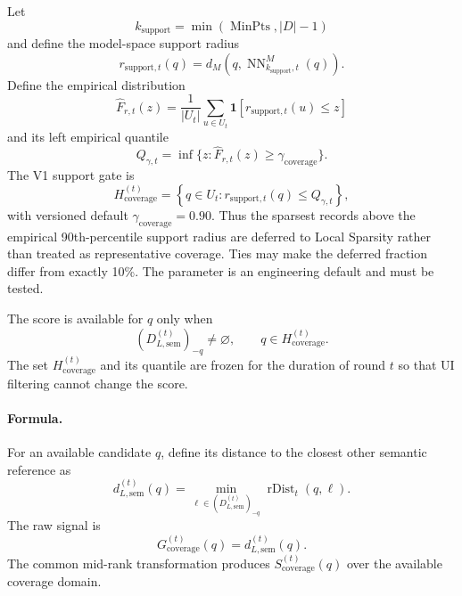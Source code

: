 \documentclass[11pt]{article}
\newcommand{\rDist}{\operatorname{rDist}}
\newcommand{\MinPts}{\operatorname{MinPts}}
\begin{document}
Let
\begin{equation}
    k_{\mathrm{support}}
    =
    \min(\MinPts,|D|-1)
\end{equation}
and define the model-space support radius
\begin{equation}
    r_{\mathrm{support},t}(q)
    =
    d_M\!\left(
        q,
        \operatorname{NN}^{M}_{k_{\mathrm{support}},t}(q)
    \right).
\end{equation}
Define the empirical distribution
\begin{equation}
    \widehat F_{r,t}(z)
    =
    \frac{1}{|U_t|}
    \sum_{u\in U_t}
    \mathbf{1}[r_{\mathrm{support},t}(u)\leq z]
\end{equation}
and its left empirical quantile
\begin{equation}
    Q_{\gamma,t}
    =
    \inf\{z:\widehat F_{r,t}(z)\geq\gamma_{\mathrm{coverage}}\}.
\end{equation}
The V1 support gate is
\begin{equation}
    H_{\mathrm{coverage}}^{(t)}
    =
    \left\{
        q\in U_t:
        r_{\mathrm{support},t}(q)\leq Q_{\gamma,t}
    \right\},
\end{equation}
with versioned default $\gamma_{\mathrm{coverage}}=0.90$. Thus the sparsest
records above the empirical 90th-percentile support radius are deferred to
Local Sparsity rather than treated as representative coverage. Ties may make
the deferred fraction differ from exactly 10\%. The parameter is an engineering
default and must be tested.

The score is available for $q$ only when
\begin{equation}
    (D_{L,\mathrm{sem}}^{(t)})_{-q}\neq\varnothing,
    \qquad
    q\in H_{\mathrm{coverage}}^{(t)}.
\end{equation}
The set $H_{\mathrm{coverage}}^{(t)}$ and its quantile are frozen for the
duration of round $t$ so that UI filtering cannot change the score.

\paragraph{Formula.}
For an available candidate $q$, define its distance to the closest other
semantic reference as
\begin{equation}
    d_{L,\mathrm{sem}}^{(t)}(q)
    =
    \min_{\ell\in(D_{L,\mathrm{sem}}^{(t)})_{-q}}\rDist_t(q,\ell).
\end{equation}
The raw signal is
\begin{equation}
    \boxed{
    G_{\mathrm{coverage}}^{(t)}(q)
    =
    d_{L,\mathrm{sem}}^{(t)}(q)
    }.
\end{equation}
The common mid-rank transformation produces
$S_{\mathrm{coverage}}^{(t)}(q)$ over the available coverage domain.
\end{document}
